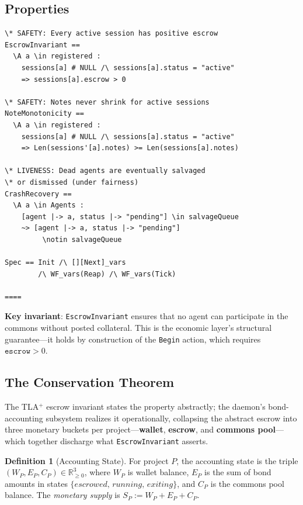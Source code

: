 \documentclass[11pt,a4paper]{article}
\theoremstyle{definition}
\newtheorem{definition}{Definition}[section]
\theoremstyle{remark}
\begin{document}
\subsection{Properties}

\begin{lstlisting}[style=tlaplus, caption={TLA$^{+}$: Safety and Liveness Properties}]
\* SAFETY: Every active session has positive escrow
EscrowInvariant ==
  \A a \in registered :
    sessions[a] # NULL /\ sessions[a].status = "active"
    => sessions[a].escrow > 0

\* SAFETY: Notes never shrink for active sessions
NoteMonotonicity ==
  \A a \in registered :
    sessions[a] # NULL /\ sessions[a].status = "active"
    => Len(sessions'[a].notes) >= Len(sessions[a].notes)

\* LIVENESS: Dead agents are eventually salvaged
\* or dismissed (under fairness)
CrashRecovery ==
  \A a \in Agents :
    [agent |-> a, status |-> "pending"] \in salvageQueue
    ~> [agent |-> a, status |-> "pending"]
         \notin salvageQueue

Spec == Init /\ [][Next]_vars
        /\ WF_vars(Reap) /\ WF_vars(Tick)

====
\end{lstlisting}

\textbf{Key invariant}: \texttt{EscrowInvariant} ensures that no agent can participate in the commons without posted collateral. This is the economic layer's structural guarantee---it holds by construction of the \texttt{Begin} action, which requires $\texttt{escrow} > 0$.

\subsection{The Conservation Theorem}\label{sec:conservation}

The TLA$^{+}$ escrow invariant states the property abstractly; the daemon's bond-accounting subsystem realizes it operationally, collapsing the abstract escrow into three monetary buckets per project---\textbf{wallet}, \textbf{escrow}, and \textbf{commons pool}---which together discharge what \texttt{EscrowInvariant} asserts.

\begin{definition}[Accounting State]\label{def:acct-state}
For project $P$, the accounting state is the triple $(W_P, E_P, C_P) \in \mathbb{R}_{\geq 0}^{3}$, where $W_P$ is wallet balance, $E_P$ is the sum of bond amounts in states $\{\textit{escrowed},\, \textit{running},\, \textit{exiting}\}$, and $C_P$ is the commons pool balance. The \emph{monetary supply} is $S_P := W_P + E_P + C_P$.
\end{definition}
\end{document}
